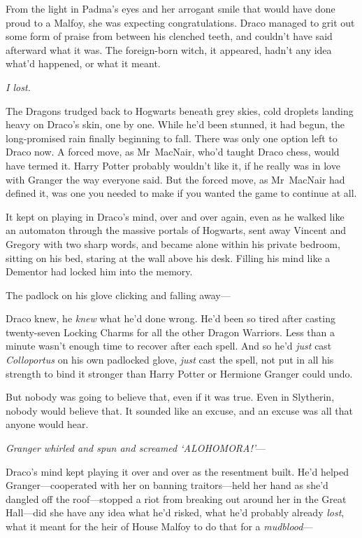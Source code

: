 From the light in Padma’s eyes and her arrogant smile that would have done
proud to a Malfoy, she was expecting congratulations. Draco managed to grit out
some form of praise from between his clenched teeth, and couldn’t have said
afterward what it was. The foreign-born witch, it appeared, hadn’t any idea
what’d happened, or what it meant.

\emph{I lost.}

The Dragons trudged back to Hogwarts beneath grey skies, cold droplets landing
heavy on Draco’s skin, one by one. While he’d been stunned, it had begun, the
long-promised rain finally beginning to fall. There was only one option left to
Draco now. A forced move, as Mr~MacNair, who’d taught Draco chess, would have
termed it. Harry Potter probably wouldn’t like it, if he really was in love
with Granger the way everyone said. But the forced move, as Mr~MacNair had
defined it, was one you needed to make if you wanted the game to continue at
all.

It kept on playing in Draco’s mind, over and over again, even as he walked like
an automaton through the massive portals of Hogwarts, sent away Vincent and
Gregory with two sharp words, and became alone within his private bedroom,
sitting on his bed, staring at the wall above his desk. Filling his mind like a
Dementor had locked him into the memory.

The padlock on his glove clicking and falling away—

Draco knew, he \emph{knew} what he’d done wrong. He’d been so tired after
casting twenty-seven Locking Charms for all the other Dragon Warriors. Less
than a minute wasn’t enough time to recover after each spell. And so he’d
\emph{just} cast \emph{Colloportus} on his own padlocked glove, \emph{just}
cast the spell, not put in all his strength to bind it stronger than Harry
Potter or Hermione Granger could undo.

But nobody was going to believe that, even if it was true. Even in Slytherin,
nobody would believe that. It sounded like an excuse, and an excuse was all
that anyone would hear.

\emph{Granger whirled and spun and screamed ‘ALOHOMORA!’}—

Draco’s mind kept playing it over and over as the resentment built. He’d helped
Granger—cooperated with her on banning traitors—held her hand as she’d
dangled off the roof—stopped a riot from breaking out around her in the Great
Hall—did she have any idea what he’d risked, what he’d probably already
\emph{lost}, what it meant for the heir of House Malfoy to do that for a
\emph{mudblood}—

